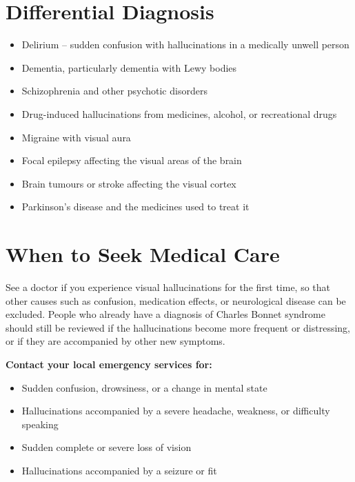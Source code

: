 \section*{Differential Diagnosis}
\begin{itemize}
    \item Delirium -- sudden confusion with hallucinations in a medically unwell person
    \item Dementia, particularly dementia with Lewy bodies
    \item Schizophrenia and other psychotic disorders
    \item Drug-induced hallucinations from medicines, alcohol, or recreational drugs
    \item Migraine with visual aura
    \item Focal epilepsy affecting the visual areas of the brain
    \item Brain tumours or stroke affecting the visual cortex
    \item Parkinson's disease and the medicines used to treat it
\end{itemize}

\section*{When to Seek Medical Care}
See a doctor if you experience visual hallucinations for the first time, so that other causes such as confusion, medication effects, or neurological disease can be excluded. People who already have a diagnosis of Charles Bonnet syndrome should still be reviewed if the hallucinations become more frequent or distressing, or if they are accompanied by other new symptoms.

\medskip
\textbf{Contact your local emergency services for:}
\begin{itemize}
    \item Sudden confusion, drowsiness, or a change in mental state
    \item Hallucinations accompanied by a severe headache, weakness, or difficulty speaking
    \item Sudden complete or severe loss of vision
    \item Hallucinations accompanied by a seizure or fit
\end{itemize}

